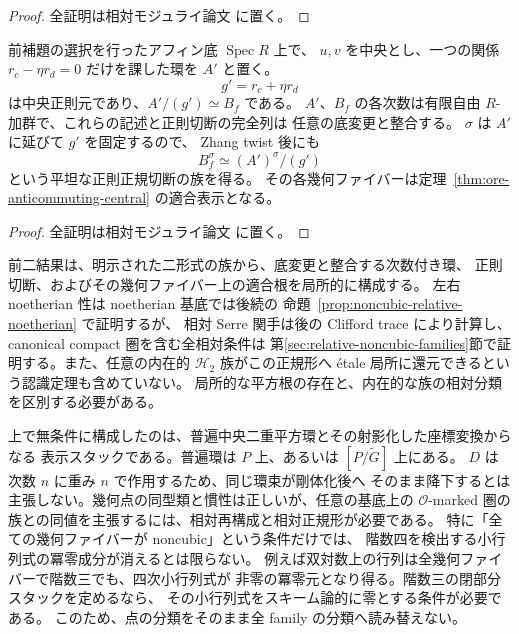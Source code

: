 \begin{proof}
全証明は相対モジュライ論文 \cite[\texttt{noncubic_stack}]{QuadricModuli2026} に置く。
\end{proof}

\begin{proposition}[局所的な正則切断の族]
\label{prop:noncubic-relative-regular-cut}
前補題の選択を行ったアフィン底 $\operatorname{Spec}R$ 上で、
$u,v$ を中央とし、一つの関係 $r_c-\eta r_d=0$ だけを課した環を $A'$ と置く。
\[
 g'=r_c+\eta r_d
\]
は中央正則元であり、$A'/(g')\simeq B_f$ である。
$A'$、$B_f$ の各次数は有限自由 $R$-加群で、これらの記述と正則切断の完全列は
任意の底変更と整合する。
$\sigma$ は $A'$ に延びて $g'$ を固定するので、
Zhang twist 後にも
\[
 B_f^\sigma\simeq (A')^\sigma/(g')
\]
という平坦な正則正規切断の族を得る。
その各幾何ファイバーは定理~\ref{thm:ore-anticommuting-central} の適合表示となる。
\end{proposition}

\begin{proof}
全証明は相対モジュライ論文 \cite[\texttt{noncubic_stack}]{QuadricModuli2026} に置く。
\end{proof}

\begin{remark}[相対主張の範囲]
前二結果は、明示された二形式の族から、底変更と整合する次数付き環、
正則切断、およびその幾何ファイバー上の適合根を局所的に構成する。
左右 noetherian 性は noetherian 基底では後続の
命題~\ref{prop:noncubic-relative-noetherian} で証明するが、
相対 Serre 関手は後の Clifford trace により計算し、
canonical compact 圏を含む全相対条件は
第\ref{sec:relative-noncubic-families}節で証明する。また、任意の内在的 $\mathcal H_2$ 族がこの正規形へ
\'etale 局所に還元できるという認識定理も含めていない。
局所的な平方根の存在と、内在的な族の相対分類を区別する必要がある。
\end{remark}

\begin{remark}[相対版として未証明の部分]
上で無条件に構成したのは、普遍中央二重平方環とその射影化した座標変換からなる
表示スタックである。普遍環は $P$ 上、あるいは $[P/\widetilde G]$ 上にある。
$D$ は次数 $n$ に重み $n$ で作用するため、同じ環束が剛体化後へ
そのまま降下するとは主張しない。幾何点の同型類と慣性は正しいが、任意の基底上の
$\mathcal O$-marked 圏の族との同値を主張するには、相対再構成と相対正規形が必要である。
特に「全ての幾何ファイバーが noncubic」という条件だけでは、
階数四を検出する小行列式の冪零成分が消えるとは限らない。
例えば双対数上の行列は全幾何ファイバーで階数三でも、四次小行列式が
非零の冪零元となり得る。階数三の閉部分スタックを定めるなら、
その小行列式をスキーム論的に零とする条件が必要である。
このため、点の分類をそのまま全 family の分類へ読み替えない。
\end{remark}



